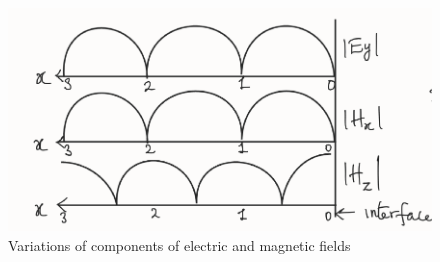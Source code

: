\begin{figure}[h]
\centering
\includegraphics[width=1\linewidth]{./graphics/lec35fig2}
\caption{Variations of components of electric and magnetic fields}
\label{fig:lec35fig2}
\end{figure}


